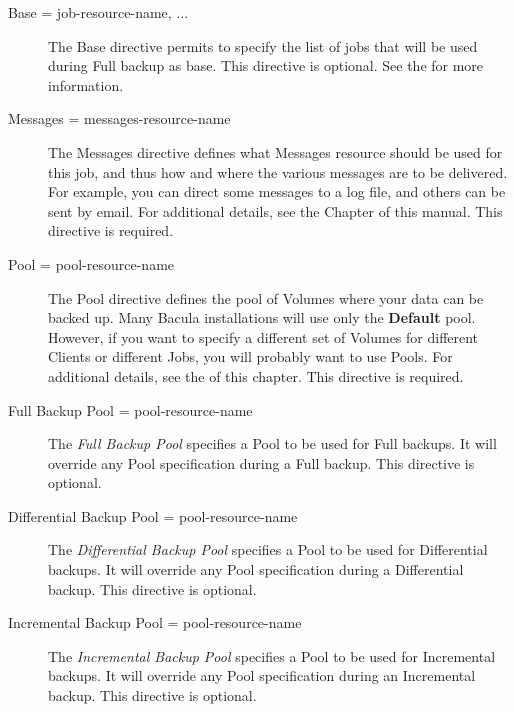 \begin{description}
\item [Base = \lt{}job-resource-name, ...\gt{}]
The Base directive permits to specify the list of jobs that will be used during
Full backup as base. This directive is optional. See the  for more information.

\item [Messages = \lt{}messages-resource-name\gt{}]
   The Messages directive defines what Messages resource should be used for
   this job, and thus how and where the various messages are to be
   delivered.  For example, you can direct some messages to a log file, and
   others can be sent by email.  For additional details, see the
    Chapter of this manual.  This
   directive is required.

\item [Pool = \lt{}pool-resource-name\gt{}]
   The Pool directive defines the pool of Volumes where your data can be
   backed up.  Many Bacula installations will use only the {\bf Default}
   pool.  However, if you want to specify a different set of Volumes for
   different Clients or different Jobs, you will probably want to use
   Pools.  For additional details, see the  of this chapter.  This directive is required.

\item [Full Backup Pool = \lt{}pool-resource-name\gt{}]
   The {\it Full Backup Pool} specifies a Pool to be used for Full backups.
   It will override any Pool specification during a Full backup.  This
   directive is optional.
   
\item [Differential Backup Pool = \lt{}pool-resource-name\gt{}]  
   The {\it Differential Backup Pool} specifies a Pool to be used for
   Differential backups.  It will override any Pool specification during a
   Differential backup.  This directive is optional.
   
\item [Incremental Backup Pool = \lt{}pool-resource-name\gt{}]  
   The {\it Incremental Backup Pool} specifies a Pool to be used for
   Incremental backups.  It will override any Pool specification during an
   Incremental backup.  This directive is optional.


\end{description}
